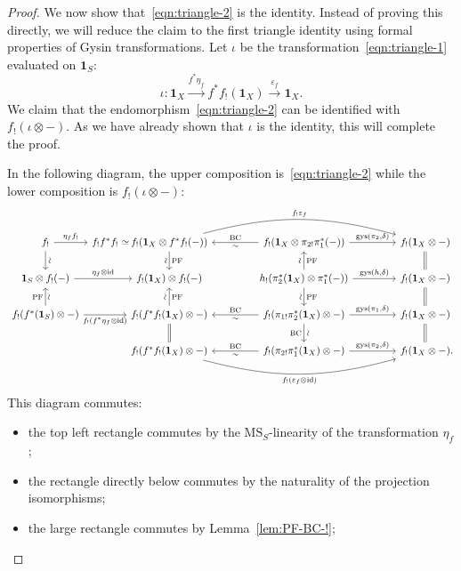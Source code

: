 \documentclass{amsart}
\numberwithin{equation}{section}
\theoremstyle{plain}
\theoremstyle{definition}
\def\1{\mathbf 1}
\def\ph{\mathord-}
\def\id{\mathrm{id}}
\def\MS{\mathrm{MS}}
\let\epsilon=\varepsilon
\begin{document}
\begin{proof}
	We now show that~\eqref{eqn:triangle-2} is the identity. Instead of proving this directly, we will reduce the claim to the first triangle identity using formal properties of Gysin transformations. 
	Let $\iota$ be the transformation~\eqref{eqn:triangle-1} evaluated on $\1_S$:
	\[
	\iota\colon \1_X \xrightarrow{f^*\eta_f} f^*f_!(\1_X)\xrightarrow{\epsilon_f} \1_X.
	\]
	We claim that the endomorphism~\eqref{eqn:triangle-2} can be identified with $f_!(\iota\otimes\mathord{-})$. As we have already shown that $\iota$ is the identity, this will complete the proof.
	
	In the following diagram, the upper composition is~\eqref{eqn:triangle-2} while the lower composition is $f_!(\iota\otimes\ph)$:
	\[
	\begin{tikzcd}[column sep=4.2em]
	f_! \ar{d}[sloped]{\sim} \ar[end anchor={[shift={(-3.8em,0)}]west}]{r}{\eta_ff_!} & \llap{$f_!f^*f_!\simeq\,$} f_!(\1_X\otimes f^*f_!(\ph)) \ar{d}{\mathrm{PF}}[swap,sloped]{\sim} \ar[<-]{r}{\mathrm{BC}}[swap]{\sim} \ar[bend left=15]{rr}{f_!\epsilon_f} & f_!(\1_X\otimes \pi_{2!}\pi_1^*(\ph)) \ar{r}{\mathrm{gys}(\pi_2,\delta)} & f_!(\1_X\otimes \ph) \\
	\1_S\otimes f_!(\ph) \ar{r}{\eta_f\otimes \id} & f_!(\1_X)\otimes f_!(\ph) & h_!(\pi_2^*(\1_X)\otimes \pi_1^*(\ph)) \ar{r}{\mathrm{gys}(h,\delta)} \ar{d}{\mathrm{PF}}[swap,sloped]{\sim} \ar{u}[sloped]{\sim}[swap]{\mathrm{PF}} & f_!(\1_X\otimes \ph) \ar[equal]{u} \ar[equal]{d} \\
	f_!(f^*(\1_S)\otimes \ph) \ar{u}{\mathrm{PF}}[swap,sloped]{\sim} \ar{r}[swap]{f_!(f^*\eta_f\otimes\id)} & f_!(f^*f_!(\1_X)\otimes \ph) \ar{u}[sloped]{\sim}[swap]{\mathrm{PF}} \ar[<-]{r}{\mathrm{BC}}[swap]{\sim} \ar[equal]{d} & f_!(\pi_{1!}\pi_2^*(\1_X)\otimes \ph) \ar{r}{\mathrm{gys}(\pi_1,\delta)} \ar{d}[sloped]{\sim}[swap]{\mathrm{BC}} & f_!(\1_X\otimes \ph) \ar[equal]{d} \\
	& f_!(f^*f_!(\1_X)\otimes \ph) \ar[<-]{r}{\mathrm{BC}}[swap]{\sim} \ar[bend right=15]{rr}[swap]{f_!(\epsilon_f\otimes \id)} & f_!(\pi_{2!}\pi_1^*(\1_X)\otimes \ph) \ar{r}{\mathrm{gys}(\pi_2,\delta)} & f_!(\1_X\otimes \ph)\rlap.
	\end{tikzcd}
	\]
	This diagram commutes:
	\begin{itemize}
		\item the top left rectangle commutes by the $\MS_S$-linearity of the transformation $\eta_f$;
		\item the rectangle directly below commutes by the naturality of the projection isomorphisms;
		\item the large rectangle commutes by Lemma~\ref{lem:PF-BC-!};

\end{itemize}
\end{proof}
\end{document}
